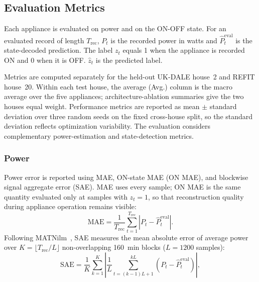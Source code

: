 \documentclass[journal]{IEEEtran}
\begin{document}
\subsection{Evaluation Metrics}
\label{sec:metrics}

Each appliance is evaluated on power and on the ON-OFF state. For an evaluated record of length $T_{\mathrm{rec}}$, $P_t$ is the recorded power in watts and $\hat P_t^{\mathrm{eval}}$ is the state-decoded prediction. The label $z_t$ equals 1 when the appliance is recorded ON and 0 when it is OFF. $\hat z_t$ is the predicted label.

Metrics are computed separately for the held-out UK-DALE house~2 and REFIT house~20. Within each test house, the average (Avg.) column is the macro average over the five appliances; architecture-ablation summaries give the two houses equal weight. Performance metrics are reported as mean $\pm$ standard deviation over three random seeds on the fixed cross-house split, so the standard deviation reflects optimization variability. The evaluation considers complementary power-estimation and state-detection metrics.

\subsubsection{Power}
Power error is reported using MAE, ON-state MAE (ON MAE), and blockwise signal aggregate error (SAE). MAE uses every sample; ON MAE is the same quantity evaluated only at samples with $z_t=1$, so that reconstruction quality during appliance operation remains visible:
\begin{equation}
\mathrm{MAE}=\frac{1}{T_{\mathrm{rec}}}\sum_{t=1}^{T_{\mathrm{rec}}}\left|P_t-\hat P_t^{\mathrm{eval}}\right|.
\label{eq:mae}
\end{equation}
Following MATNilm~\cite{xiong2024matnilm}, SAE measures the mean absolute error of average power over $K=\lfloor T_{\mathrm{rec}}/L\rfloor$ non-overlapping 160~min blocks ($L=1200$ samples):
\begin{equation}
\mathrm{SAE}=\frac{1}{K}\sum_{k=1}^{K}\left|\frac{1}{L}\sum_{t=(k-1)L+1}^{kL}\left(P_t-\hat P_t^{\mathrm{eval}}\right)\right|,
\label{eq:sae}
\end{equation}
\end{document}
